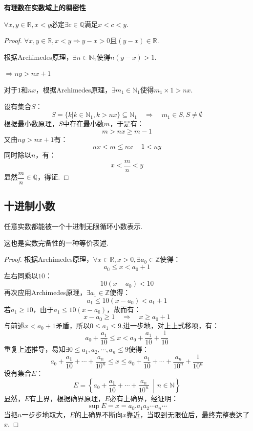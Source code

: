 \begin{theorem}
    \textbf{有理数在实数域上的稠密性}

    $\forall x,y \in \mathbb{R}, x<y$必定$\exists c \in \mathbb{Q}$满足$x<c<y$.
\end{theorem}

\begin{proof}
    $\forall x,y \in \mathbb{R}, x<y \Rightarrow y-x>0$且$(y-x) \in \mathbb{R}$.

    根据Archimedes原理，$\exists n \in \mathbb{N}_1$使得$n(y-x)>1$.

    $\Rightarrow ny>nx+1$

    对于$1$和$nx$，根据Archimedes原理，$\exists m_1 \in \mathbb{N}_1$使得$m_1 \times 1 > nx$.

    设有集合$S$：
    \[S = \{k | k \in \mathbb{N}_1, k>nx\} \subseteq \mathbb{N}_1 \quad\Rightarrow\quad m_1 \in S, S \neq \emptyset\]
    根据最小数原理，$S$中存在最小数$m$，于是有：
    \[m > nx \geqslant m-1\]
    又由$ny>nx+1$有：
    \[nx < m \leqslant nx+1 < ny\]
    同时除以$n$，有：
    \[x < \frac{m}{n} < y\]
    显然$\dfrac{m}{n} \in \mathbb{Q}$，得证.
\end{proof}


\subsection{十进制小数}
\begin{proposition}
    任意实数都能被一个十进制无限循环小数表示.
\end{proposition}
    这也是实数完备性的一种等价表述.
\begin{proof}
    根据Archimedes原理，$\forall x \in \mathbb{R}, x>0, \exists a_0 \in \mathbb{Z}$使得：
    \[a_0 \leqslant x < a_0+1\]
    左右同乘以$10$：
    \[10(x-a_0)<10\]
    再次应用Archimedes原理，$\exists a_1 \in \mathbb{Z}$使得：
    \[a_1 \leqslant 10(x-a_0) < a_1+1\]
    若$a_1 \geqslant 10$，由于$a_1 \leqslant 10(x-a_0)$，故而有：
    \[x-a_0 \geqslant 1 \quad\Rightarrow\quad x \geqslant a_0 + 1\]
    与前述$x<a_0+1$矛盾，所以$0 \leqslant a_1 \leqslant 9$.进一步地，对上上式移项，有：
    \[a_0 + \frac{a_1}{10} \leqslant x < a_0 + \frac{a_1}{10} + \frac{1}{10}\]
    重复上述推导，易知$\exists 0 \leqslant a_1, a_2, \cdots, a_n \leqslant 9$使得：
    \[a_0 + \frac{a_1}{10} + \cdots + \frac{a_n}{10^n} \leqslant x \leqslant a_0 + \frac{a_1}{10} + \cdots + \frac{a_n}{10^n} + \frac{1}{10^n}\]
    设有集合$E$：
    \[E = \left\{a_0 + \frac{a_1}{10} + \cdots + \frac{a_n}{10^n}\,\middle|\, n \in \mathbb{N}\right\}\]
    显然，$E$有上界，根据确界原理，$E$必有上确界，经证明：
    \[\sup E = x = a_0.a_1a_2 \cdots a_n \cdots\]
    当把$n$一步步地取大，$E$的上确界不断向$x$靠近，当取到无限位后，最终完整表达了$x$.
\end{proof}

